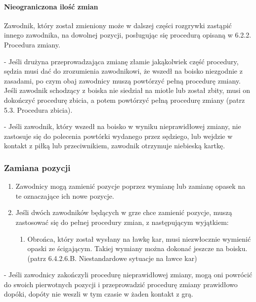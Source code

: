 \documentclass[12pt]{article}
\newcommand\bluecard{\bgroup\color{blue}\markoverwith{\textcolor{blue}{\rule[-0.5ex]{2pt}{0.4pt}}}\ULon}
\newcommand\other{\bgroup\color{green}\markoverwith{\textcolor{green}{\rule[-0.5ex]{2pt}{0.4pt}}}\ULon}
\begin{document}
\paragraph{Nieograniczona ilość zmian}
Zawodnik, który został
zmieniony może w dalszej części rozgrywki zastąpić innego zawodnika, na
dowolnej pozycji, posługując się procedurą opisaną w 6.2.2. Procedura
zmiany.

\other{Powtórka} - Jeśli drużyna przeprowadzająca zmianę złamie
jakąkolwiek część procedury, sędzia musi dać do zrozumienia zawodnikowi,
że wszedł na boisko niezgodnie z zasadami, po czym obaj zawodnicy muszą
powtórzyć pełną procedurę zmiany. Jeśli zawodnik schodzący z boiska nie
siedział na miotle lub został zbity, musi on dokończyć procedurę zbicia,
a potem powtórzyć pełną procedurę zmiany (patrz 5.3. Procedura zbicia).

\bluecard{Niebieska kartka} - Jeśli zawodnik, który wszedł na boisko w
wyniku nieprawidłowej zmiany, nie zastosuje się do polecenia powtórki
wydanego przez sędziego, lub wejdzie w kontakt z piłką lub
przeciwnikiem, zawodnik otrzymuje niebieską kartkę.

\subsubsection{Zamiana pozycji}

\begin{enumerate}
	\item
	      Zawodnicy mogą zamienić pozycje poprzez wymianę lub zamianę opasek na
	      te oznaczające ich nowe pozycje.
	\item
	      Jeśli dwóch zawodników będących w grze chce zamienić pozycje, muszą
	      zastosować się do pełnej procedury zmian, z następującym wyjątkiem:

	      \begin{enumerate}
		      \item
		            Obrońca, który został wysłany na ławkę kar, musi niezwłocznie
		            wymienić opaski ze ścigającym. Takiej wymiany można dokonać jeszcze
		            na boisku. (patrz 6.4.2.6.B. Niestandardowe sytuacje na ławce kar)
	      \end{enumerate}
\end{enumerate}

\other{Powtórka} - Jeśli zawodnicy zakończyli procedurę nieprawidłowej
zmiany, mogą oni powrócić do swoich pierwotnych pozycji i przeprowadzić
procedurę zmiany prawidłowo dopóki, dopóty nie weszli w
tym czasie w żaden kontakt z grą.
\end{document}
